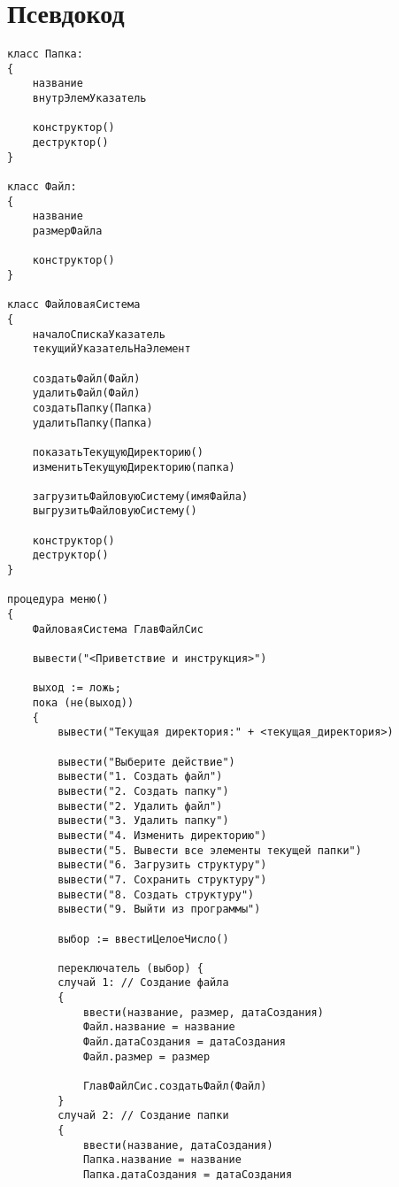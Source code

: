 \label{sec:pseudocode}
\section{Псевдокод}

\fontsize{8pt}{10pt}\selectfont
\begin{verbatim}
класс Папка:
{
    название
    внутрЭлемУказатель

    конструктор()
    деструктор()
}

класс Файл:
{
    название
    размерФайла

    конструктор()
}

класс ФайловаяСистема
{
    началоСпискаУказатель
    текущийУказательНаЭлемент

    создатьФайл(Файл)
    удалитьФайл(Файл)
    создатьПапку(Папка)
    удалитьПапку(Папка)

    показатьТекущуюДиректорию()
    изменитьТекущуюДиректорию(папка)

    загрузитьФайловуюСистему(имяФайла)
    выгрузитьФайловуюСистему()

    конструктор()
    деструктор()
}

процедура меню()
{
    ФайловаяСистема ГлавФайлСис

    вывести("<Приветствие и инструкция>")

    выход := ложь;
    пока (не(выход))
    {
        вывести("Текущая директория:" + <текущая_директория>)

        вывести("Выберите действие")
        вывести("1. Создать файл")
        вывести("2. Создать папку")
        вывести("2. Удалить файл")
        вывести("3. Удалить папку")
        вывести("4. Изменить директорию")
        вывести("5. Вывести все элементы текущей папки")
        вывести("6. Загрузить структуру")
        вывести("7. Сохранить структуру")
        вывести("8. Создать структуру")
        вывести("9. Выйти из программы")
    
        выбор := ввестиЦелоеЧисло()
        
        переключатель (выбор) {
        случай 1: // Создание файла
        {
            ввести(название, размер, датаСоздания)
            Файл.название = название
            Файл.датаСоздания = датаСоздания
            Файл.размер = размер

            ГлавФайлСис.создатьФайл(Файл)
        }
        случай 2: // Создание папки
        {
            ввести(название, датаСоздания)
            Папка.название = название
            Папка.датаСоздания = датаСоздания


\end{verbatim}

